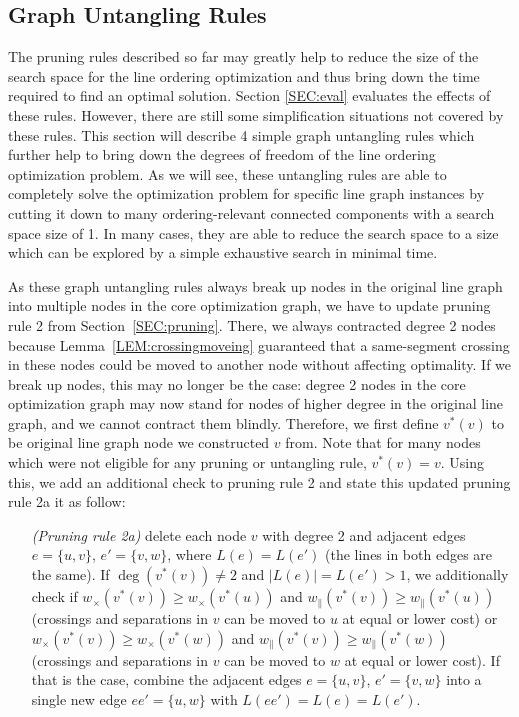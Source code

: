 \documentclass[format=acmsmall, review=false, screen=true]{acmart}
\begin{document}
\subsection{Graph Untangling Rules}\label{SEC:untangling}

The pruning rules described so far may greatly help to reduce the size of the search space for the line ordering optimization and thus bring down the time required to find an optimal solution. Section \ref{SEC:eval} evaluates the effects of these rules. However, there are still some simplification situations not covered by these rules. This section will describe 4 simple graph untangling rules which further help to bring down the degrees of freedom of the line ordering optimization problem. As we will see, these untangling rules are able to completely solve the optimization problem for specific line graph instances by cutting it down to many ordering-relevant connected components with a search space size of 1. In many cases, they are able to reduce the search space to a size which can be explored by a simple exhaustive search in minimal time.

As these graph untangling rules always break up nodes in the original line graph into multiple nodes in the core optimization graph, we have to update pruning rule 2 from Section~\ref{SEC:pruning}. There, we always contracted degree 2 nodes because Lemma~\ref{LEM:crossingmoveing} guaranteed that a same-segment crossing in these nodes could be moved to another node without affecting optimality. If we break up nodes, this may no longer be the case: degree 2 nodes in the core optimization graph may now stand for nodes of higher degree in the original line graph, and we cannot contract them blindly. Therefore, we first define $v^*(v)$ to be original line graph node we constructed $v$ from. Note that for many nodes which were not eligible for any pruning or untangling rule, $v^*(v) = v$. Using this, we add an additional check to pruning rule 2 and state this updated pruning rule 2a it as follow:
\begin{enumerate}[parsep=0.5mm, wide, labelwidth=0mm, itemindent=2.3mm]
  \setlength\itemsep{1pt}
  \item[\emph{(Pruning rule 2a)}] delete each node $v$ with degree 2 and adjacent edges $e = \{u, v\}$, $e' = \{v, w\}$,
  where 
  $L(e) = L(e')$ (the lines in both edges are the same). If $\deg(v^*(v)) \neq 2$ and $|L(e)| = L(e') > 1$, we additionally check if
  $w_\times(v^*(v)) \geq w_\times(v^*(u))$ and $w_\|(v^*(v)) \geq w_\|(v^*(u))$ (crossings and separations in $v$ can be moved to $u$ at equal or lower cost) 
  or
  $w_\times(v^*(v)) \geq w_\times(v^*(w))$ and $w_\|(v^*(v)) \geq w_\|(v^*(w))$ (crossings and separations in $v$ can be moved to $w$ at equal or lower cost). If that is the case, combine the adjacent edges $e = \{u, v\}$, $e' = \{v, w\}$ into a single new edge $ee' = \{u, w\}$ with $L(ee') = L(e) = L(e')$.
\end{enumerate}
\end{document}
